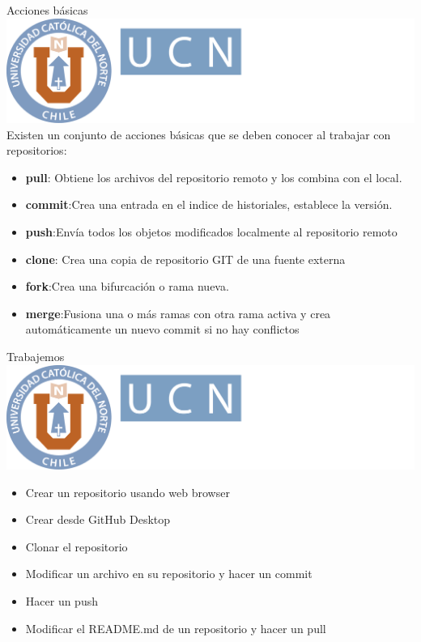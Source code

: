 \documentclass[12pt,a4paper,usenames,x11names,compress]{beamer}
\begin{document}
\begin{frame}{Acciones básicas \hfill \includegraphics[scale=.1]{eciem.png}}
Existen un conjunto de acciones básicas que se deben conocer al trabajar con repositorios:
\begin{itemize}
\justifying
\item \textbf{pull}: Obtiene los archivos del repositorio remoto y los combina con el local.
\item \textbf{commit}:Crea una entrada en el indice de historiales, establece la versión.
\item \textbf{push}:Envía todos los objetos modificados localmente al repositorio remoto
\item \textbf{clone}: Crea una copia de repositorio GIT de una fuente externa
\item \textbf{fork}:Crea una bifurcación o rama nueva.
\item \textbf{merge}:Fusiona una o más ramas con otra rama activa y crea automáticamente un nuevo commit si no hay conflictos
\end{itemize}
\end{frame}

\begin{frame}{Trabajemos \hfill \includegraphics[scale=.1]{eciem.png}}
\begin{itemize}
\item Crear un repositorio usando web browser
\item Crear desde GitHub Desktop
\item Clonar el repositorio
\item Modificar un archivo en su repositorio y hacer un commit
\item Hacer un push
\item Modificar el README.md de un repositorio y hacer un pull
\end{itemize}
\end{frame}
\end{document}
